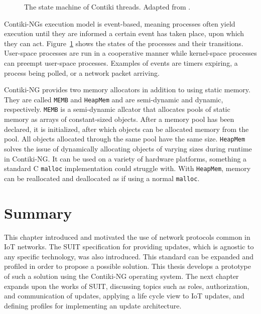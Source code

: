 \documentclass[0-thesis.tex]{subfiles}
\begin{document}
\begin{figure}
    \caption[The state machine of Contiki threads.]
        {The state machine of Contiki threads. Adapted from \parencite{contiki-multithreading}.}
    \label{fig:state-machine}
\end{figure}

Contiki-NGs execution model is event-based, meaning processes often yield execution until
they are informed a certain event has taken place, upon which they can act.
Figure~\ref{fig:state-machine} shows the states of the processes and their transitions.
User-space processes are run in a cooperative manner while kernel-space processes can
preempt user-space processes. Examples of events are timers expiring, a process being
polled, or a network packet arriving.

Contiki-NG provides two memory allocators in addition to using static memory. They are
called \texttt{MEMB} and \texttt{HeapMem} and are semi-dynamic and dynamic, respectively.
\texttt{MEMB} is a semi-dynamic allcator that allocates pools of static memory as arrays
of constant-sized objects. After a memory pool has been declared, it is initialized, after
which objects can be allocated memory from the pool. All objects allocated through the
same pool have the same size. \texttt{HeapMem} solves the issue of dynamically allocating
objects of varying sizes during runtime in Contiki-NG. It can be used on a variety of
hardware platforms, something a standard C \texttt{malloc} implementation could struggle
with. With \texttt{HeapMem}, memory can be reallocated and deallocated as if using a normal
\texttt{malloc}.

\section{Summary}
\label{sec:2-summary}
This chapter introduced and motivated the use of network protocols common in IoT networks.
The SUIT specification for providing updates, which is agnostic to any specific
technology, was also introduced. This standard can be expanded and profiled in order to
propose a possible solution. This thesis develops a prototype of such a solution using the
Contiki-NG operating system. The next chapter expands upon the works of SUIT, discussing
topics such as roles, authorization, and communication of updates, applying a life cycle
view to IoT updates, and defining profiles for implementing an update architecture.
\end{document}
